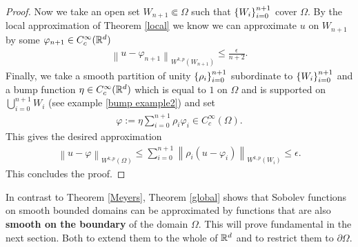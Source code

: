 \documentclass[12pt]{article}
\theoremstyle{remark}
\renewcommand{\norm}[1]{\left\lVert #1 \right\rVert}\renewcommand{\abs}[1]{\left| #1 \right|}
\begin{document}
\begin{proof}
	Now we take an open set $W_{n+1} \Subset \Omega$ such that $\left\{W_i\right\}_{i=0}^{n+1} $ cover $\Omega$. By the local approximation of Theorem \ref{local} we know we can approximate  $u$ on  $W_{n+1}$ by some $\varphi_{n+1} \in C_c^\infty(\mathbb{R}^d)$
	\begin{align*}
		\norm{u-\varphi_{n+1}}_{W^{k,p}(W_{n+1})}\leq\frac{\epsilon}{n+2} .
	\end{align*}
	Finally, we take a smooth partition of unity $\left\{\rho _i\right\}_{i=0}^{n+1}$ subordinate to $\left\{W_i\right\}_{i=0}^{n+1} $ and a bump function $\eta \in C_c^\infty(\mathbb{R}^d)$ which is equal to $1$ on  $\Omega$ and is supported on $\bigcup_{i=0}^{n+1} W_i$ (see example \ref{bump example2}) and set
	\begin{align*}
		\varphi:= \eta \sum_{i=0}^{n+1} \rho _i \varphi_i \in  C^\infty_c(\Omega) .
	\end{align*}
	This gives the desired approximation
	\begin{align*}
		\norm{u-\varphi}_{W^{k,p}(\Omega)} \leq \sum_{i=0}^{n+1} \norm{\rho _i(u-\varphi_i)}_{W^{k,p}(W_i)} \leq  \epsilon  .
	\end{align*}
	This concludes the proof.
\end{proof}
In contrast to Theorem \ref{Meyers}, Theorem \ref{global} shows that Sobolev functions on smooth bounded domains can be approximated by functions that are also \textbf{smooth on the boundary} of the domain $\Omega$. This will prove fundamental in the next section. Both to extend them to the whole of $\mathbb{R}^d$ and to restrict them to $\partial \Omega$.
\end{document}
